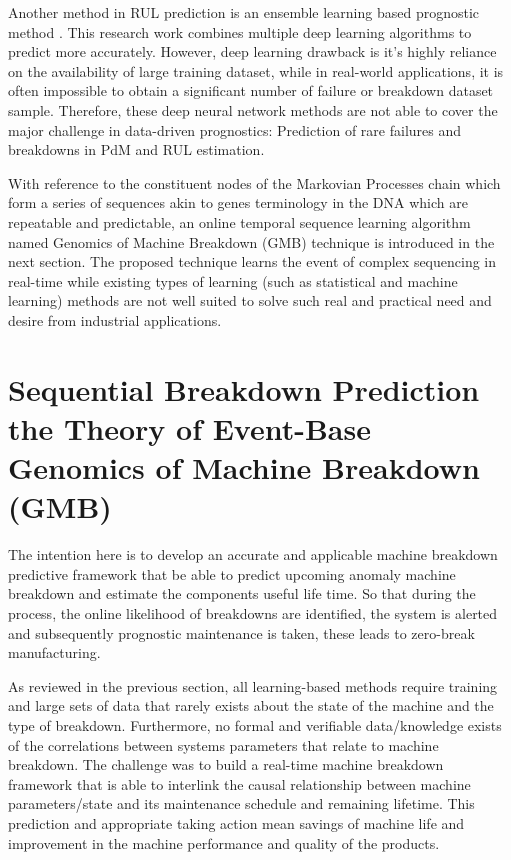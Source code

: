 \documentclass[conference]{IEEEtran}
\begin{document}
Another method in RUL prediction is an ensemble learning based prognostic method \cite{Li2019b}. This research work combines multiple deep learning algorithms to predict more accurately.  However, deep learning drawback is it’s highly reliance on the availability of large training dataset, while in real-world applications, it is often impossible to obtain a significant number of failure or breakdown dataset sample. Therefore, these deep neural network methods are not able to cover the major challenge in data-driven prognostics: Prediction of rare failures and breakdowns in PdM and RUL estimation. 

With reference to the constituent nodes of the Markovian Processes chain which form a series of sequences akin to genes terminology in the DNA which are repeatable and predictable, an online temporal sequence learning algorithm named Genomics of Machine Breakdown (GMB) technique is introduced in the next section. The proposed technique learns the event of complex sequencing in real-time while existing types of learning (such as statistical and machine learning) methods are not well suited to solve such real and practical need and desire from industrial applications.



\section{Sequential Breakdown Prediction the Theory of Event-Base Genomics of Machine Breakdown (GMB)}
\label{sec:GMB}
The intention here is to develop an accurate and applicable machine breakdown predictive framework that be able to predict upcoming anomaly machine breakdown and estimate the components useful life time. So that during the process, the online likelihood of breakdowns are identified, the system is alerted and subsequently prognostic maintenance is taken, these leads to zero-break manufacturing.

As reviewed in the previous section, all learning-based methods require training and large sets of data that rarely exists about the state of the machine and the type of breakdown. Furthermore, no formal and verifiable data/knowledge exists of the correlations between systems parameters that relate to machine breakdown. The challenge was to build a real-time machine breakdown framework that is able to interlink the causal relationship between machine parameters/state and its maintenance schedule and remaining lifetime. This prediction and appropriate taking action mean savings of machine life and improvement in the machine performance and quality of the products.
\end{document}
